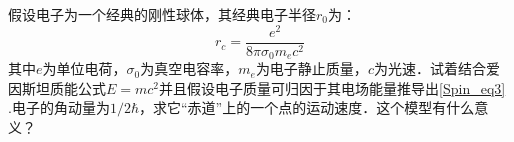 
\begin{exercise}{}
假设电子为一个经典的刚性球体，其经典电子半径$r_0$为：
\begin{equation}\label{Spin_eq3}
r_c=\frac{e^2}{8\pi\sigma_0m_e c^2}
\end{equation}
其中$e$为单位电荷，$\sigma_0$为真空电容率，$m_e$为电子静止质量，$c$为光速．试着结合爱因斯坦质能公式$E=mc^2$并且假设电子质量可归因于其电场能量推导出\autoref{Spin_eq3} .电子的角动量为$1/2\hbar$，求它“赤道”上的一个点的运动速度．这个模型有什么意义？
\end{exercise}
